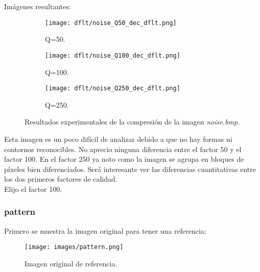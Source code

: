 \documentclass[12pt,a4paper]{article}
\begin{document}
Imágenes resultantes:
\begin{figure}   [H]
    \begin{subfigure}{0.30\textwidth}
        \centering
        \texttt{[image: dflt/noise\_Q50\_dec\_dflt.png]}
        \caption{Q=50.}
        
    \end{subfigure}
    \hfill
    \begin{subfigure}{0.30\textwidth}
        \centering
        \texttt{[image: dflt/noise\_Q100\_dec\_dflt.png]}
        \caption{Q=100.}
        
    \end{subfigure}
    \hfill
    \begin{subfigure}{0.30\textwidth}
        \centering
        \texttt{[image: dflt/noise\_Q250\_dec\_dflt.png]}
        \caption{Q=250.}
        
    \end{subfigure}
    
    \caption[Resultados experimentales - noise]{Resultados experimentales de la compresión de la imagen \textit{noise.bmp}.}
    
\end{figure}

Esta imagen es un poco difícil de analizar debido a que no hay formas ni contornos reconocibles. No aprecio ninguna diferencia entre el factor 50 y el factor 100. En el factor 250 ya noto como la imagen se agrupa en bloques de píxeles bien diferenciados. Será interesante ver las diferencias cuantitativas entre los dos primeros factores de calidad.\\

Elijo el factor 100.


\subsubsection{pattern}
Primero se muestra la imagen original para tener una referencia:
\begin{figure}[H]
    \centering
    \texttt{[image: images/pattern.png]}
    \caption[Referencia - pattern]{Imagen original de referencia.}
    
\end{figure}
    \vspace{0.5cm}
\end{document}
